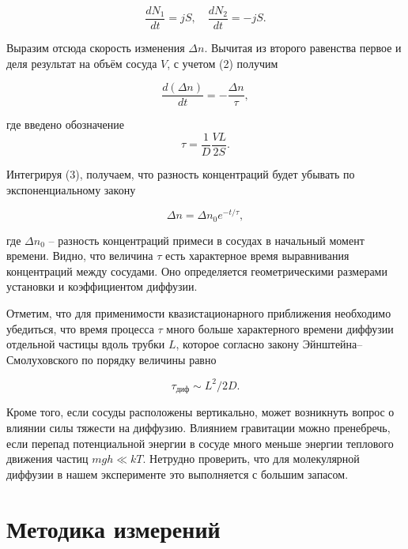 \documentclass[a4paper,12pt]{article} %
\begin{document}
\begin{equation}\label{5}
\frac{dN_1}{dt}=jS, \quad \frac{dN_2}{dt}=-jS.
\end{equation}

\noindent Выразим отсюда скорость изменения $ \Delta n $. Вычитая из второго равенства первое и деля результат на объём сосуда $ V $, с учетом (2) получим

\begin{equation}\label{6}
\frac{d(\Delta n)}{dt}=-\frac{\Delta n}{\tau},
\end{equation}

\noindent где введено обозначение
\begin{equation}\label{7}
\tau=\frac{1}{D}\frac{VL}{2S}.
\end{equation}

\noindent Интегрируя (3), получаем, что разность концентраций будет убывать по экспоненциальному закону

\begin{equation}\label{8}
\Delta n = \Delta n_0 e^{-t/\tau},
\end{equation}

\noindent где $ \Delta n_0 $ -- разность концентраций примеси в сосудах в начальный момент времени. Видно, что величина $ \tau $ есть характерное время выравнивания концентраций между сосудами. Оно определяется геометрическими размерами установки и коэффициентом диффузии.

\medskip

\noindent Отметим, что для применимости квазистационарного приближения необходимо убедиться, что время процесса $ \tau $ много больше характерного времени диффузии отдельной частицы вдоль трубки $ L $, которое согласно закону Эйнштейна–Смолуховского по порядку величины равно

\begin{equation}\label{9}
\tau_\text{диф} \sim L^2/2D.
\end{equation}

\noindent Кроме того, если сосуды расположены вертикально, может возникнуть вопрос о влиянии силы тяжести на диффузию. Влиянием гравитации можно пренебречь, если перепад потенциальной энергии в сосуде много меньше энергии теплового движения частиц $ mgh \ll kT $. Нетрудно проверить, что для молекулярной диффузии в нашем эксперименте это выполняется с большим запасом.

\medskip

\section{Методика измерений}
\end{document}
